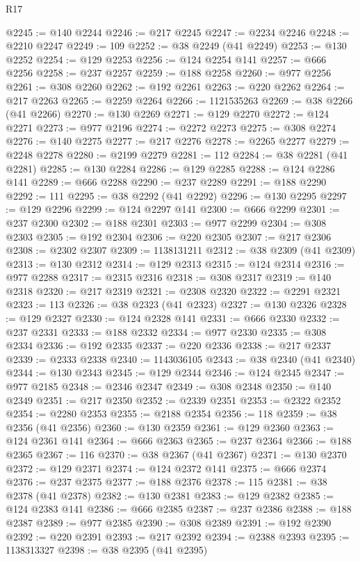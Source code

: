 \begin{lexlean}{R17}
\begin{coremodule}
@2245 := @140 @2244
@2246 := @217 @2245
@2247 := @2234 @2246
@2248 := @2210 @2247
@2249 := 109
@2252 := @38 @2249 (@41 @2249)
@2253 := @130 @2252
@2254 := @129 @2253
@2256 := @124 @2254 @141
@2257 := @666 @2256
@2258 := @237 @2257
@2259 := @188 @2258
@2260 := @977 @2256
@2261 := @308 @2260
@2262 := @192 @2261
@2263 := @220 @2262
@2264 := @217 @2263
@2265 := @2259 @2264
@2266 := 1121535263
@2269 := @38 @2266 (@41 @2266)
@2270 := @130 @2269
@2271 := @129 @2270
@2272 := @124 @2271
@2273 := @977 @2196
@2274 := @2272 @2273
@2275 := @308 @2274
@2276 := @140 @2275
@2277 := @217 @2276
@2278 := @2265 @2277
@2279 := @2248 @2278
@2280 := @2199 @2279
@2281 := 112
@2284 := @38 @2281 (@41 @2281)
@2285 := @130 @2284
@2286 := @129 @2285
@2288 := @124 @2286 @141
@2289 := @666 @2288
@2290 := @237 @2289
@2291 := @188 @2290
@2292 := 111
@2295 := @38 @2292 (@41 @2292)
@2296 := @130 @2295
@2297 := @129 @2296
@2299 := @124 @2297 @141
@2300 := @666 @2299
@2301 := @237 @2300
@2302 := @188 @2301
@2303 := @977 @2299
@2304 := @308 @2303
@2305 := @192 @2304
@2306 := @220 @2305
@2307 := @217 @2306
@2308 := @2302 @2307
@2309 := 1138131211
@2312 := @38 @2309 (@41 @2309)
@2313 := @130 @2312
@2314 := @129 @2313
@2315 := @124 @2314
@2316 := @977 @2288
@2317 := @2315 @2316
@2318 := @308 @2317
@2319 := @140 @2318
@2320 := @217 @2319
@2321 := @2308 @2320
@2322 := @2291 @2321
@2323 := 113
@2326 := @38 @2323 (@41 @2323)
@2327 := @130 @2326
@2328 := @129 @2327
@2330 := @124 @2328 @141
@2331 := @666 @2330
@2332 := @237 @2331
@2333 := @188 @2332
@2334 := @977 @2330
@2335 := @308 @2334
@2336 := @192 @2335
@2337 := @220 @2336
@2338 := @217 @2337
@2339 := @2333 @2338
@2340 := 1143036105
@2343 := @38 @2340 (@41 @2340)
@2344 := @130 @2343
@2345 := @129 @2344
@2346 := @124 @2345
@2347 := @977 @2185
@2348 := @2346 @2347
@2349 := @308 @2348
@2350 := @140 @2349
@2351 := @217 @2350
@2352 := @2339 @2351
@2353 := @2322 @2352
@2354 := @2280 @2353
@2355 := @2188 @2354
@2356 := 118
@2359 := @38 @2356 (@41 @2356)
@2360 := @130 @2359
@2361 := @129 @2360
@2363 := @124 @2361 @141
@2364 := @666 @2363
@2365 := @237 @2364
@2366 := @188 @2365
@2367 := 116
@2370 := @38 @2367 (@41 @2367)
@2371 := @130 @2370
@2372 := @129 @2371
@2374 := @124 @2372 @141
@2375 := @666 @2374
@2376 := @237 @2375
@2377 := @188 @2376
@2378 := 115
@2381 := @38 @2378 (@41 @2378)
@2382 := @130 @2381
@2383 := @129 @2382
@2385 := @124 @2383 @141
@2386 := @666 @2385
@2387 := @237 @2386
@2388 := @188 @2387
@2389 := @977 @2385
@2390 := @308 @2389
@2391 := @192 @2390
@2392 := @220 @2391
@2393 := @217 @2392
@2394 := @2388 @2393
@2395 := 1138313327
@2398 := @38 @2395 (@41 @2395)

\end{coremodule}
\end{lexlean}
